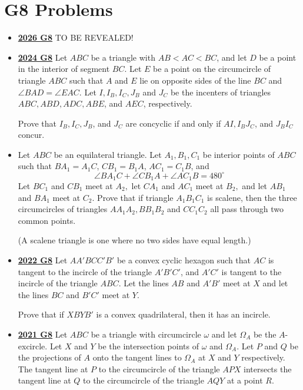 \documentclass[11pt]{scrartcl}
\begin{document}
\section*{G8 Problems}  \label{G8}
\begin{itemize}[leftmargin=*]


\item \href{https://www.imo-official.org/assets/documents/problems/2026/IMO2026SL.pdf}{\textbf{2026 G8}} TO BE REVEALED!

\item \href{https://artofproblemsolving.com/community/c6h3610449p35340922}{\textbf{2024 G8}} Let $ABC$ be a triangle with $AB<AC<BC$, and let $D$ be a point in the interior of segment $BC$. Let $E$ be a point on the circumcircle of triangle $ABC$ such that $A$ and $E$ lie on opposite sides of the line $BC$ and $\angle{BAD}=\angle{EAC}$. Let $I,I_B,I_C,J_B$ and $J_C$ be the incenters of triangles $ABC,ABD,ADC,ABE$, and $AEC$, respectively. 

Prove that $I_B,I_C,J_B$, and $J_C$ are concyclic if and only if $AI,I_BJ_C$, and $J_BI_C$ concur.
\item {} Let $ABC$ be an equilateral triangle. Let $A_1,B_1,C_1$ be interior points of $ABC$ such that $BA_1=A_1C$, $CB_1=B_1A$, $AC_1=C_1B$, and
$$\angle BA_1C+\angle CB_1A+\angle AC_1B=480^\circ$$Let $BC_1$ and $CB_1$ meet at $A_2,$ let $CA_1$ and $AC_1$ meet at $B_2,$ and let $AB_1$ and $BA_1$ meet at $C_2.$
Prove that if triangle $A_1B_1C_1$ is scalene, then the three circumcircles of triangles $AA_1A_2, BB_1B_2$
and $CC_1C_2$ all pass through two common points.

(A scalene triangle is one where no two sides have equal length.)
    \item  \href{https://artofproblemsolving.com/community/c6h3107351p28104372}{\textbf{2022 G8}} Let $AA'BCC'B'$ be a convex cyclic hexagon such that $AC$ is tangent to the incircle of the triangle $A'B'C'$, and $A'C'$ is tangent to the incircle of the triangle $ABC$. Let the lines $AB$ and $A'B'$ meet at $X$ and let the lines $BC$ and $B'C'$ meet at $Y$. 
    
    Prove that if $XBYB'$ is a convex quadrilateral, then it has an incircle.
\item \href{https://artofproblemsolving.com/community/c6h2882551p25627547}{\textbf{2021 G8}} Let $ABC$ be a triangle with circumcircle $\omega$ and let $\Omega_A$ be the $A$-excircle. Let $X$ and $Y$ be the intersection points of $\omega$ and $\Omega_A$. Let $P$ and $Q$ be the projections of $A$ onto the tangent lines to $\Omega_A$ at $X$ and $Y$ respectively. The tangent line at $P$ to the circumcircle of the triangle $APX$ intersects the tangent line at $Q$ to the circumcircle of the triangle $AQY$ at a point $R$. 


\end{itemize}
\end{document}
